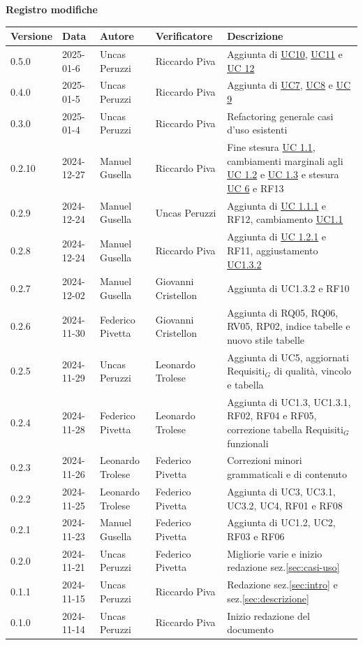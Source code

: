 \documentclass[11pt]{article}
\begin{document}
\centering\textbf{Registro modifiche}\\
\vspace{2mm}
\begin{tabularx}{\textwidth}{|l|l|l|l|X|}
\hline
\textbf{Versione} & \textbf{Data} & \textbf{Autore} & \textbf{Verificatore} & \textbf{Descrizione} \\
\hline
0.5.0 & 2025-01-6 & Uncas Peruzzi & Riccardo Piva & Aggiunta di \hyperref[UC10]{UC10}, \hyperref[UC11]{UC11} e \hyperref[UC12]{UC 12}\\
\hline
0.4.0 & 2025-01-5 & Uncas Peruzzi & Riccardo Piva & Aggiunta di \hyperref[UC7]{UC7}, \hyperref[UC8]{UC8} e \hyperref[UC9]{UC 9}\\
\hline
0.3.0 & 2025-01-4 & Uncas Peruzzi & Riccardo Piva & Refactoring generale casi d'uso esistenti\\
\hline
0.2.10 & 2024-12-27 & Manuel Gusella & Riccardo Piva & Fine stesura \hyperref[UC1.1]{UC 1.1}, cambiamenti marginali agli \hyperref[UC1.2]{UC 1.2} e \hyperref[UC1.3]{UC 1.3} e stesura \hyperref[UC6]{UC 6} e RF13\\
\hline
0.2.9 & 2024-12-24 & Manuel Gusella & Uncas Peruzzi & Aggiunta di \hyperref[UC1.1.1]{UC 1.1.1} e RF12, cambiamento \hyperref[UC1.1]{UC1.1} \\
\hline
0.2.8 & 2024-12-24 & Manuel Gusella & Riccardo Piva & Aggiunta di \hyperref[UC1.2.1]{UC 1.2.1} e RF11, aggiustamento \hyperref[UC1.3.2]{UC1.3.2} \\
\hline
0.2.7 & 2024-12-02 & Manuel Gusella & Giovanni Cristellon & Aggiunta di UC1.3.2 e RF10 \\
\hline
0.2.6 & 2024-11-30 & Federico Pivetta & Giovanni Cristellon & Aggiunta di RQ05, RQ06, RV05, RP02, indice tabelle e nuovo stile tabelle \\
\hline
0.2.5 & 2024-11-29 & Uncas Peruzzi & Leonardo Trolese & Aggiunta di UC5, aggiornati Requisiti$_G$ di qualità, vincolo e tabella \\
\hline
0.2.4 & 2024-11-28 & Federico Pivetta & Leonardo Trolese & Aggiunta di UC1.3, UC1.3.1, RF02, RF04 e RF05, correzione tabella Requisiti$_G$ funzionali \\
\hline
0.2.3 & 2024-11-26 & Leonardo Trolese  & Federico Pivetta & Correzioni minori grammaticali e di contenuto \\
\hline
0.2.2 & 2024-11-25 & Leonardo Trolese  & Federico Pivetta & Aggiunta di UC3, UC3.1, UC3.2, UC4, RF01 e RF08 \\
\hline
0.2.1 & 2024-11-23 & Manuel Gusella  & Federico Pivetta & Aggiunta di UC1.2, UC2, RF03 e RF06\\
\hline
0.2.0 & 2024-11-21 & Uncas Peruzzi  & Federico Pivetta & Migliorie varie e inizio redazione sez.\ref{sec:casi-uso} \\
\hline
0.1.1 & 2024-11-15 & Uncas Peruzzi  & Riccardo Piva & Redazione sez.\ref{sec:intro} e sez.\ref{sec:descrizione} \\
\hline
0.1.0 & 2024-11-14 & Uncas Peruzzi  & Riccardo Piva & Inizio redazione del documento\\
\hline
\end{tabularx}
\end{document}

